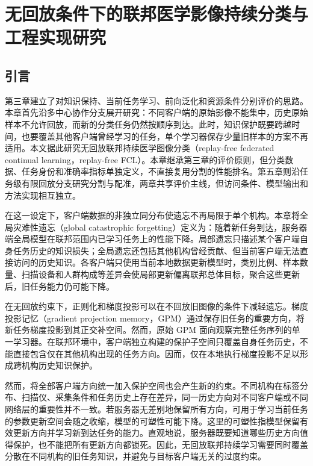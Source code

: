 \chapter{无回放条件下的联邦医学影像持续分类与工程实现研究}
\label{chap:fedsubmerge}
\setlength{\emergencystretch}{1em}

\section{引言}
\label{sec:fedsubmerge-introduction}

第三章建立了对知识保持、当前任务学习、前向泛化和资源条件分别评价的思路。本章首先沿多中心协作分支展开研究：不同客户端的原始影像不能集中，历史原始样本不允许回放，而新的分类任务仍然按顺序到达。此时，知识保护既要跨越时间，也要覆盖其他客户端曾经学习的任务，单个学习器保存少量旧样本的方案不再适用。本文据此研究无回放联邦持续医学图像分类（replay-free federated continual learning，replay-free FCL）\cite{mcmahan2017fedavg,rieke2020future,yoon2021fedweit}。本章继承第三章的评价原则，但分类数据、任务身份和准确率指标单独定义，不直接复用分割的性能排名。第五章则沿任务级有限回放分支研究分割与配准，两章共享评价主线，但访问条件、模型输出和方法实现相互独立。

在这一设定下，客户端数据的非独立同分布使遗忘不再局限于单个机构。本章将全局灾难性遗忘（global catastrophic forgetting）定义为：随着新任务到达，服务器端全局模型在联邦范围内已学习任务上的性能下降。局部遗忘只描述某个客户端自身任务历史的知识损失；全局遗忘还包括其他机构曾经贡献、但当前客户端无法直接访问的历史知识。各客户端只使用当前本地数据更新模型时，类别比例、样本数量、扫描设备和人群构成等差异会使局部更新偏离联邦总体目标，聚合这些更新后，旧任务能力仍可能下降\cite{dong2022glfc}。

在无回放约束下，正则化和梯度投影可以在不回放旧图像的条件下减轻遗忘。梯度投影记忆（gradient projection memory，GPM）通过保存旧任务的重要方向，将新任务梯度投影到其正交补空间\cite{saha2021gpm}。然而，原始 GPM 面向观察完整任务序列的单一学习器。在联邦环境中，客户端独立构建的保护子空间只覆盖自身任务历史，不能直接包含仅在其他机构出现的任务方向。因而，仅在本地执行梯度投影不足以形成跨机构历史知识保护。

然而，将全部客户端方向统一加入保护空间也会产生新的约束。不同机构在标签分布、扫描仪、采集条件和任务历史上存在差异，同一历史方向对不同客户端或不同网络层的重要性并不一致。若服务器无差别地保留所有方向，可用于学习当前任务的参数更新空间会随之收缩，模型的可塑性可能下降。这里的可塑性指模型保留有效更新方向并学习新到达任务的能力。直观地说，服务器既要知道哪些历史方向值得保护，也不能把所有更新方向都锁死。因此，无回放联邦持续学习需要同时覆盖分散在不同机构的旧任务知识，并避免与目标客户端无关的过度约束。

